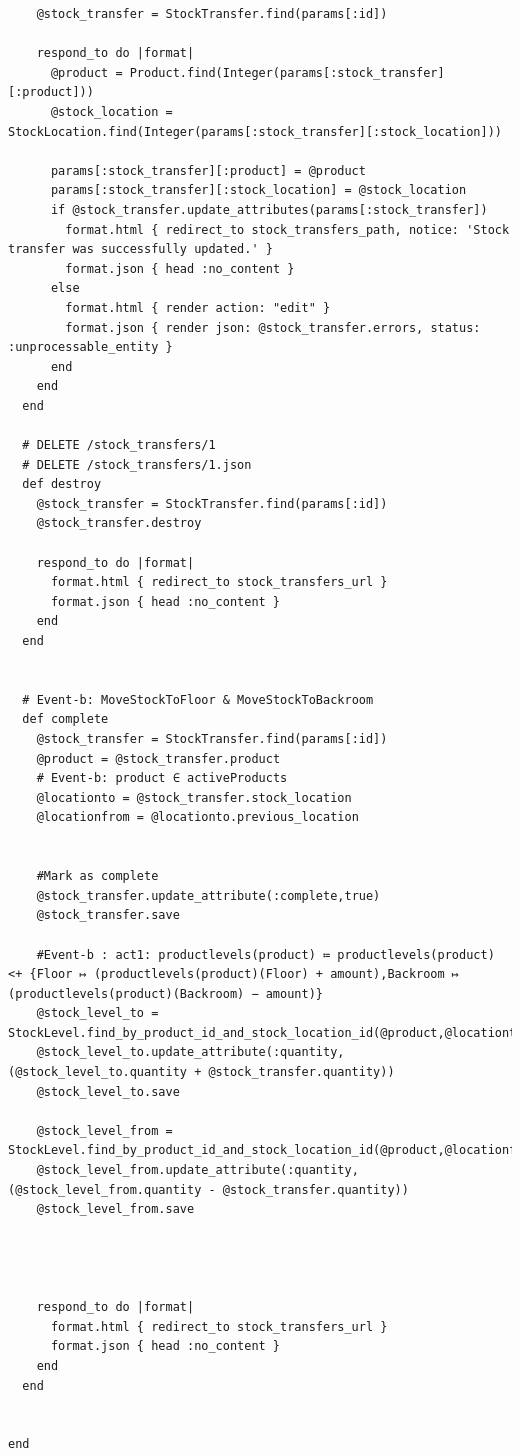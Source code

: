 \documentclass[a4paper]{article}
\begin{document}
\begin{verbatim}
    @stock_transfer = StockTransfer.find(params[:id])

    respond_to do |format|
      @product = Product.find(Integer(params[:stock_transfer][:product]))
      @stock_location = StockLocation.find(Integer(params[:stock_transfer][:stock_location]))

      params[:stock_transfer][:product] = @product
      params[:stock_transfer][:stock_location] = @stock_location
      if @stock_transfer.update_attributes(params[:stock_transfer])
        format.html { redirect_to stock_transfers_path, notice: 'Stock transfer was successfully updated.' }
        format.json { head :no_content }
      else
        format.html { render action: "edit" }
        format.json { render json: @stock_transfer.errors, status: :unprocessable_entity }
      end
    end
  end

  # DELETE /stock_transfers/1
  # DELETE /stock_transfers/1.json
  def destroy
    @stock_transfer = StockTransfer.find(params[:id])
    @stock_transfer.destroy

    respond_to do |format|
      format.html { redirect_to stock_transfers_url }
      format.json { head :no_content }
    end
  end

  
  # Event-b: MoveStockToFloor & MoveStockToBackroom
  def complete
    @stock_transfer = StockTransfer.find(params[:id])
    @product = @stock_transfer.product
    # Event-b: product ∈ activeProducts
    @locationto = @stock_transfer.stock_location
    @locationfrom = @locationto.previous_location


    #Mark as complete
    @stock_transfer.update_attribute(:complete,true)
    @stock_transfer.save

    #Event-b : act1: productlevels(product) ≔ productlevels(product) <+ {Floor ↦ (productlevels(product)(Floor) + amount),Backroom ↦ (productlevels(product)(Backroom) − amount)}
    @stock_level_to = StockLevel.find_by_product_id_and_stock_location_id(@product,@locationto)
    @stock_level_to.update_attribute(:quantity, (@stock_level_to.quantity + @stock_transfer.quantity))
    @stock_level_to.save

    @stock_level_from = StockLevel.find_by_product_id_and_stock_location_id(@product,@locationfrom)
    @stock_level_from.update_attribute(:quantity, (@stock_level_from.quantity - @stock_transfer.quantity))
    @stock_level_from.save




    respond_to do |format|
      format.html { redirect_to stock_transfers_url }
      format.json { head :no_content }
    end
  end


end

\end{verbatim}
\end{document}
